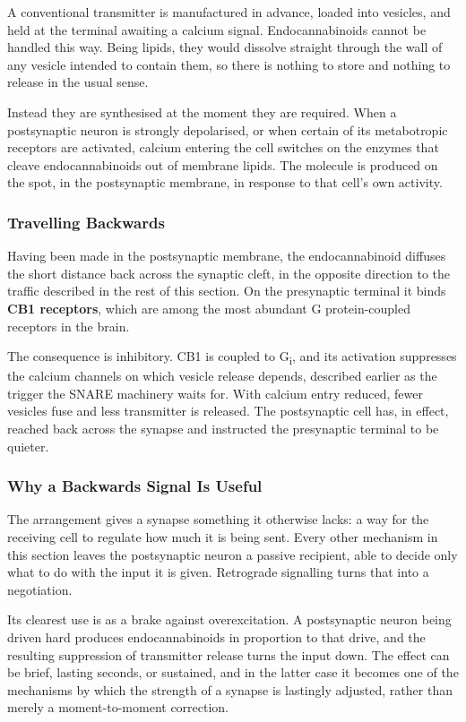 \documentclass[11pt]{article}
\begin{document}
A conventional transmitter is manufactured in advance, loaded into vesicles, and held at the terminal awaiting a calcium signal. Endocannabinoids cannot be handled this way. Being lipids, they would dissolve straight through the wall of any vesicle intended to contain them, so there is nothing to store and nothing to release in the usual sense.

Instead they are synthesised at the moment they are required. When a postsynaptic neuron is strongly depolarised, or when certain of its metabotropic receptors are activated, calcium entering the cell switches on the enzymes that cleave endocannabinoids out of membrane lipids. The molecule is produced on the spot, in the postsynaptic membrane, in response to that cell's own activity.

\subsubsection{Travelling Backwards}

Having been made in the postsynaptic membrane, the endocannabinoid diffuses the short distance back across the synaptic cleft, in the opposite direction to the traffic described in the rest of this section. On the presynaptic terminal it binds \textbf{CB1 receptors}, which are among the most abundant G protein-coupled receptors in the brain.

The consequence is inhibitory. CB1 is coupled to G\textsubscript{i}, and its activation suppresses the calcium channels on which vesicle release depends, described earlier as the trigger the SNARE machinery waits for. With calcium entry reduced, fewer vesicles fuse and less transmitter is released. The postsynaptic cell has, in effect, reached back across the synapse and instructed the presynaptic terminal to be quieter.

\subsubsection{Why a Backwards Signal Is Useful}

The arrangement gives a synapse something it otherwise lacks: a way for the receiving cell to regulate how much it is being sent. Every other mechanism in this section leaves the postsynaptic neuron a passive recipient, able to decide only what to do with the input it is given. Retrograde signalling turns that into a negotiation.

Its clearest use is as a brake against overexcitation. A postsynaptic neuron being driven hard produces endocannabinoids in proportion to that drive, and the resulting suppression of transmitter release turns the input down. The effect can be brief, lasting seconds, or sustained, and in the latter case it becomes one of the mechanisms by which the strength of a synapse is lastingly adjusted, rather than merely a moment-to-moment correction.
\end{document}
